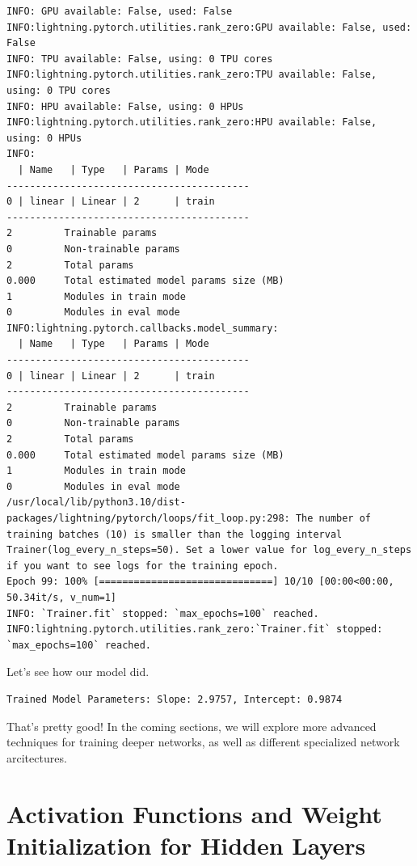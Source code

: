 \documentclass{article}
\begin{document}
\begin{lstlisting}[style=output]
INFO: GPU available: False, used: False
INFO:lightning.pytorch.utilities.rank_zero:GPU available: False, used: False
INFO: TPU available: False, using: 0 TPU cores
INFO:lightning.pytorch.utilities.rank_zero:TPU available: False, using: 0 TPU cores
INFO: HPU available: False, using: 0 HPUs
INFO:lightning.pytorch.utilities.rank_zero:HPU available: False, using: 0 HPUs
INFO: 
  | Name   | Type   | Params | Mode 
------------------------------------------
0 | linear | Linear | 2      | train
------------------------------------------
2         Trainable params
0         Non-trainable params
2         Total params
0.000     Total estimated model params size (MB)
1         Modules in train mode
0         Modules in eval mode
INFO:lightning.pytorch.callbacks.model_summary:
  | Name   | Type   | Params | Mode 
------------------------------------------
0 | linear | Linear | 2      | train
------------------------------------------
2         Trainable params
0         Non-trainable params
2         Total params
0.000     Total estimated model params size (MB)
1         Modules in train mode
0         Modules in eval mode
/usr/local/lib/python3.10/dist-packages/lightning/pytorch/loops/fit_loop.py:298: The number of training batches (10) is smaller than the logging interval Trainer(log_every_n_steps=50). Set a lower value for log_every_n_steps if you want to see logs for the training epoch.
Epoch 99: 100% [==============================] 10/10 [00:00<00:00, 50.34it/s, v_num=1]
INFO: `Trainer.fit` stopped: `max_epochs=100` reached.
INFO:lightning.pytorch.utilities.rank_zero:`Trainer.fit` stopped: `max_epochs=100` reached.
\end{lstlisting}

Let's see how our model did.



\begin{lstlisting}[style=output]
Trained Model Parameters: Slope: 2.9757, Intercept: 0.9874
\end{lstlisting}

That's pretty good! In the coming sections, we will explore more advanced techniques for training deeper networks, as well as different specialized network arcitectures.

\section{Activation Functions and Weight Initialization for Hidden Layers} %
\end{document}
